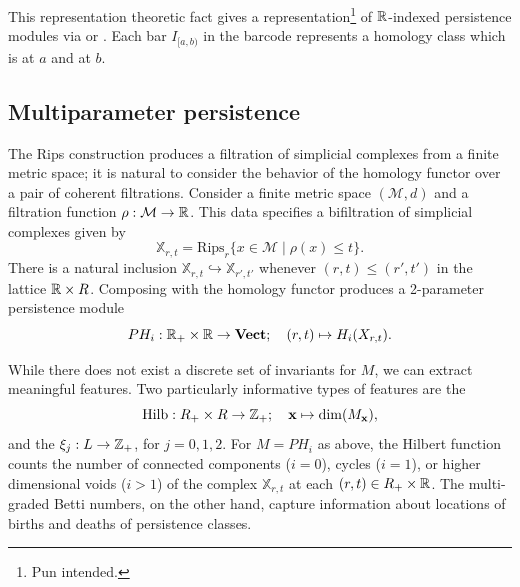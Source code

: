 \documentclass{article}
\begin{document}
This representation theoretic fact gives a representation\footnote{Pun intended.} of
$\mathbb{R}$-indexed persistence modules via  or
. Each bar $I_{[a,b)}$ in the barcode represents
a homology class which is  at $a$ and  at $b$.

\subsection{Multiparameter persistence}
The Rips construction produces a filtration of simplicial complexes from a
finite metric space; it is natural to consider the behavior of the homology
functor over a pair of coherent filtrations. Consider
a finite metric space $(\mathcal M, d)$ and a filtration
function $\rho:\mathcal M \to \mathbb{R}$. This data specifies a bifiltration of
simplicial complexes given by
\[\mathbb{X}_{r,t} = \text{Rips}_r\{x \in \mathcal M \mid \rho(x) \leq t\}.\]
There is a natural inclusion $\mathbb{X}_{r,t} \hookrightarrow
\mathbb{X}_{r',t'}$ whenever $(r,t) \leq (r',t')$ in the lattice $\mathbb{R} \times R$.
Composing with the homology functor produces a 2-parameter persistence module
\[PH_{i}: \mathbb{R}_+ \times \mathbb{R} \to \operatorname{\mathbf{Vect}}; \quad (r,t) \mapsto H_i(X_{r,t}).\]



While there does not exist a discrete set of invariants for $M$, we can extract
meaningful features. Two particularly informative types of features are 
 the 
  \[\text{Hilb}: R_+ \times R \to \mathbb{Z}_+;\quad \mathbf{x} \mapsto \dim(M_\mathbf{x}),\] and
the  $\xi_j: L \to \mathbb{Z}_+$, for $j =
0,1,2$. For $M = PH_i$ as above, the Hilbert function counts the number of
connected components ($i=0$), cycles ($i=1$), or higher dimensional voids ($i >
1$) of the complex $\mathbb{X}_{r,t}$ at each $(r,t) \in R_+\times \mathbb{R}$. The multi-graded
Betti numbers, on the other hand, capture information about locations of births
and deaths of persistence classes.
\end{document}
